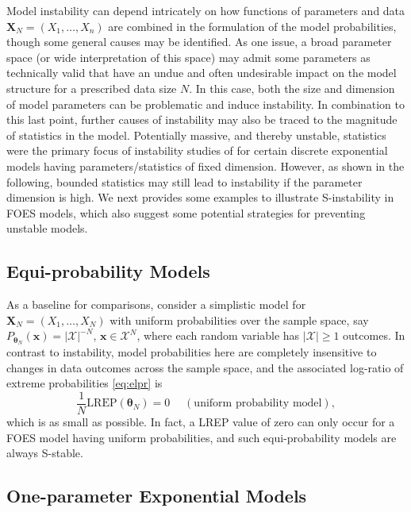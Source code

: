 \documentclass[numbib]{imamat}
\theoremstyle{theorem}
\theoremstyle{lemma}
\theoremstyle{example}
\theoremstyle{corollary}
\theoremstyle{definition}
\theoremstyle{remark}
\theoremstyle{approximation}
\theoremstyle{scheme}
\newcommand{\REP}{\mathrm{LREP}}
\begin{document}
Model instability can depend intricately on how functions of parameters
and data \(\boldsymbol X_N=(X_1,\ldots,X_n)\) are combined in the
formulation of the model probabilities, though some general causes may
be identified. As one issue, a broad parameter space (or wide
interpretation of this space) may admit some parameters as technically
valid that have an undue and often undesirable impact on the model
structure for a prescribed data size \(N\). In this case, both the size
and dimension of model parameters can be problematic and induce
instability. In combination to this last point, further causes of
instability may also be traced to the magnitude of statistics in the
model. Potentially massive, and thereby unstable, statistics were the
primary focus of instability studies of
\citet{schweinberger2011instability} for certain discrete exponential
models having parameters/statistics of fixed dimension. However, as
shown in the following, bounded statistics may still lead to instability
if the parameter dimension is high. We next provides some examples to
illustrate S-instability in FOES models, which also suggest some
potential strategies for preventing unstable models.

\hypertarget{equi-probability-models}{%
\subsection{Equi-probability Models}\label{equi-probability-models}}

As a baseline for comparisons, consider a simplistic model for
\(\boldsymbol X_N=(X_1,\ldots,X_N)\) with uniform probabilities over the
sample space, say
\(P_{\boldsymbol \theta_N}(\boldsymbol x)= |\mathcal{X}|^{-N}\),
\(\boldsymbol x \in \mathcal{X}^N\), where each random variable has
\(|\mathcal{X}| \geq 1\) outcomes. In contrast to instability, model
probabilities here are completely insensitive to changes in data
outcomes across the sample space, and the associated log-ratio of
extreme probabilities \eqref{eq:elpr} is \[
\frac{1}{N} \REP(\boldsymbol \theta_N)=0\quad \;(\text{uniform probability model}),
\] which is as small as possible. In fact, a LREP value of zero can only
occur for a FOES model having uniform probabilities, and such
equi-probability models are always S-stable.

\hypertarget{one-param-exp}{%
\subsection{One-parameter Exponential Models}\label{one-param-exp}}
\end{document}
